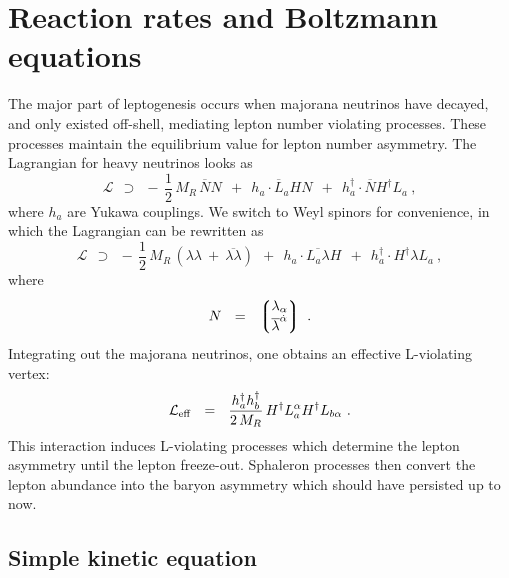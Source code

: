 \documentclass[12pt]{revtex4}
\newcommand{\ov}{\overline}
\begin{document}
	

%
%
\section{Reaction rates and Boltzmann equations}

	The major part of leptogenesis occurs when majorana neutrinos have decayed,
	and only existed off-shell, mediating lepton number violating processes.
	These processes maintain the equilibrium value for 
	lepton number asymmetry. 
	The Lagrangian for heavy neutrinos looks as
\begin{equation}
	\mathcal{L}  ~~\supset~~ -\,\frac 12\, M_R\, \ov{N}N ~~+~~
				h_a\cdot \ov{L}_aHN ~~+~~  
				h_a^\dagger\cdot \ov{N}H^\dagger L_a~,
\end{equation}
	where $ h_a $ are Yukawa couplings.
	We switch to Weyl spinors for convenience, in which the Lagrangian can be rewritten as
\begin{equation}
	\mathcal{L}  ~~\supset~~ 
	-\,\frac 12\, M_R\, \left( \lambda\lambda ~+~ \ov{\lambda\lambda} \right) ~~+~~
				h_a\cdot \ov{L_a\lambda}H ~~+~~  
				h_a^\dagger\cdot H^\dagger \lambda L_a~,
\end{equation}
	where
\[	
	N  ~~=~~ \left\lgroup 
		\begin{matrix}
			\lambda_\alpha \\
			\ov{\lambda}^{\dot{\alpha}}
		\end{matrix}
		\right\rgroup~.
\]
	Integrating out the majorana neutrinos, one obtains an effective L-violating vertex:
\begin{equation}
\label{L_eff}
	\mathcal{L}_{\rm eff} ~~=~~ \frac{h_a^\dag h_b^\dag}{2\, M_R} \, H^\dag L_a^\alpha H^\dag L_{b\alpha}~.
\end{equation}
	This interaction induces L-violating processes which determine the lepton asymmetry
	until the lepton freeze-out.
	Sphaleron processes then convert the lepton abundance into the baryon asymmetry which
	should have persisted up to now.

\subsection{Simple kinetic equation}
\end{document}
